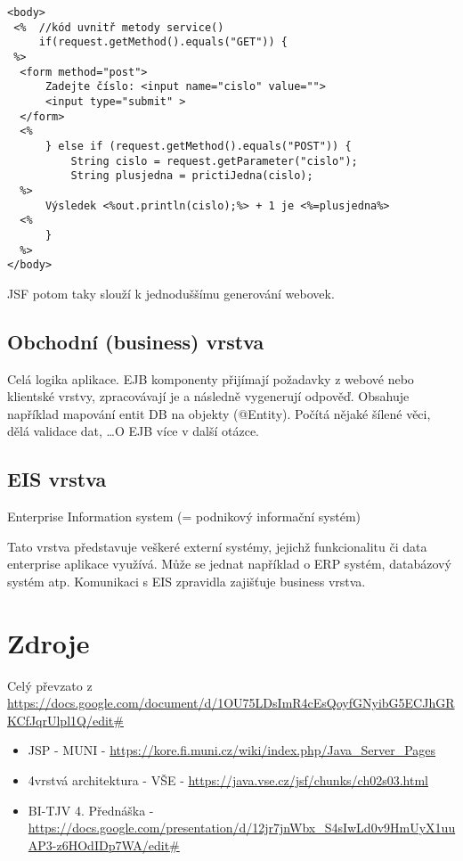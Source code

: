 \documentclass{../szzclass}
\begin{document}
\begin{verbatim}
<body>
 <%  //kód uvnitř metody service()
     if(request.getMethod().equals("GET")) {
 %>
  <form method="post">
      Zadejte číslo: <input name="cislo" value="">
      <input type="submit" >
  </form>
  <%
      } else if (request.getMethod().equals("POST")) {
          String cislo = request.getParameter("cislo");
          String plusjedna = prictiJedna(cislo);
  %>
      Výsledek <%out.println(cislo);%> + 1 je <%=plusjedna%> 
  <%
      }
  %>
</body>
\end{verbatim}

JSF potom taky slouží k jednoduššímu generování webovek.

\subsection{Obchodní (business) vrstva}
Celá logika aplikace. EJB komponenty přijímají požadavky z webové nebo klientské vrstvy, zpracovávají je a následně vygenerují odpověď. Obsahuje například mapování entit DB na objekty (@Entity). Počítá nějaké šílené věci, dělá validace dat, \dots O EJB více v další otázce.

\subsection{EIS vrstva}
Enterprise Information system (= podnikový informační systém)

Tato vrstva představuje veškeré externí systémy, jejichž funkcionalitu či data enterprise aplikace využívá. Může se jednat například o ERP systém, databázový systém atp. Komunikaci s EIS zpravidla zajišťuje business vrstva.

\section{Zdroje}
Celý převzato z \url{https://docs.google.com/document/d/1OU75LDsImR4cEsQoyfGNyibG5ECJhGRKCfJqrUlpl1Q/edit#}
\begin{itemize}
  \item JSP - MUNI - \url{https://kore.fi.muni.cz/wiki/index.php/Java_Server_Pages }
  \item 4vrstvá architektura - VŠE - \url{https://java.vse.cz/jsf/chunks/ch02s03.html}
  \item BI-TJV 4. Přednáška - \url{https://docs.google.com/presentation/d/12jr7jnWbx_S4sIwLd0v9HmUyX1uuAP3-z6HOdIDp7WA/edit#}
\end{itemize}
\end{document}

